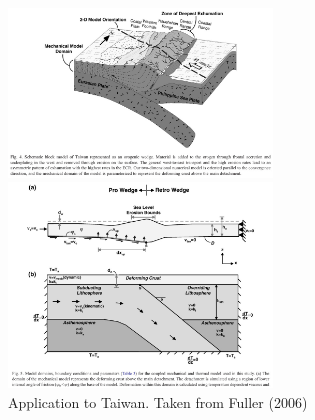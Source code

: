 \begin{center}
\includegraphics[width=7cm]{images/surfaceprocesses/fuwf06a}
\includegraphics[width=7cm]{images/surfaceprocesses/fuwf06b}\\
{\captionfont Application to Taiwan. Taken from Fuller \etal (2006) \cite{fuwf06}}
\end{center}


